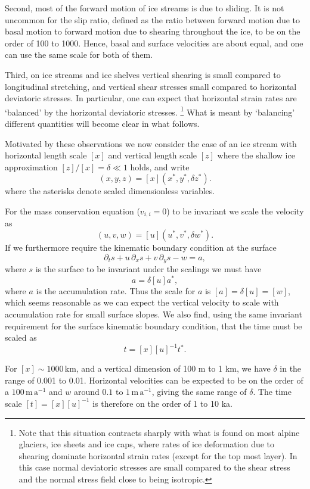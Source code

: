 \documentclass[10pt,a4paper]{book}
\newcommand{\p}{\partial}
\newcommand{\de}{\delta}
\begin{document}
Second, most of the forward motion of ice streams is due to sliding. It is not uncommon for
the slip ratio, defined as the ratio between forward motion due to basal motion to forward motion
due to shearing throughout the ice, to be on the order of 100 to 1000.  Hence, basal and surface
velocities are about equal, and one can use the same scale for both of them.

Third, on ice streams and ice shelves vertical shearing is small
compared to longitudinal stretching, and vertical shear stresses small
compared to horizontal deviatoric stresses. In particular, one can
expect that horizontal strain rates are `balanced' by the horizontal
deviatoric stresses.
\footnote{Note that this situation contracts
sharply with what is found on most alpine glaciers, ice sheets
and ice caps, where rates of ice deformation due to shearing
dominate horizontal strain rates (except for the top most
layer). In this case normal deviatoric stresses are small compared
to the shear stress and the normal stress field close to being
isotropic.}  What is meant by `balancing' different quantities will
become clear in what follows.




Motivated by these observations we now consider the case of an ice
stream with horizontal length scale $[x]$ and vertical length scale
$[z]$ where the shallow ice approximation $[z]/[x]=\de \ll 1$ holds,
and write
\[
(x,y,z)=[x](x^*,y^*,\de z^*).
\]
where the asterisks denote scaled dimensionless  variables.  



For the
mass conservation equation ($v_{i,i}=0$) to be invariant we scale the
velocity as
\begin{equation}
(u,v,w)=[u] (u^*,v^*,\de w^*).
\label{eq:scaleu}
\end{equation}
If we furthermore require the kinematic boundary condition at the
surface 
\[
\p_t s + u \, \p_x s +v \, \p_y s-w =a,
\]
where $s$ is the surface to be invariant under the scalings we must have
\[ a=\de [u] a^* ,\] 
where $a$ is the accumulation rate. Thus the scale for $a$ is $[a]=\de [u]=[w]$, which seems
reasonable as we can expect the vertical velocity to scale with accumulation rate for small surface
slopes.  We also find, using the same invariant requirement for the surface kinematic boundary
condition, that the time must be scaled as
\[ t=[x] [u]^{-1} t^* .\]



For $[x] \sim 1000\,\mathrm{km}$, and a vertical dimension of 100 m
to 1 km, we have $\de$ in the range of 0.001 to 0.01. Horizontal
velocities can be expected to be on the order of a
$100\,\mathrm{m\,a^{-1}}$ and $w$ around $0.1$ to
$1\,\mathrm{m\,a^{-1}}$, giving the same range of $\de$. The time scale
$[t]=[x] [u]^{-1}$ is therefore on the order of 1 to 10 ka.
\end{document}
